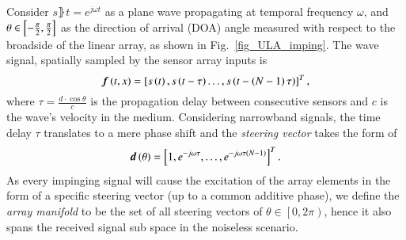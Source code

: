 Consider $s\rBrace{t} = e^{j\omega{t}}$ as a plane wave propagating at temporal frequency $\omega$, and $\theta \in \left[{-\frac{\pi}{2},\frac{\pi}{2}}\right]$ as the direction of arrival (DOA) angle measured with respect to the broadside of the linear array, as shown in Fig.~\ref{fig_ULA_imping}.
The wave signal, spatially sampled by the sensor array inputs is
\begin{equation}
\label{eq_prlm_timeSpace_outputVec}
\boldsymbol{f}\left({t,x}\right) = \left[{s\left({t}\right),s\left({t-\tau}\right)\dots, s\left({t-\left({N-1}\right)\tau}\right)}\right]^{T},
\end{equation}
where $\tau = \frac{d\cdot{}\cos{\theta}}{c}$ is the propagation delay between consecutive sensors and $c$ is the wave's velocity in the medium.
Considering narrowband signals, the time delay $\tau$ translates to a mere phase shift and the \emph{steering vector} takes the form of
\begin{equation}
\boldsymbol{d}\left({\theta}\right)=\left[{1,e^{-j\omega\tau},\dots,e^{-j\omega\tau\left({N-1}\right)}}\right]^{T}.
\end{equation}
As every impinging signal will cause the excitation of the array elements in the form of a specific steering vector (up to a common additive phase), we define the \emph{array manifold} to be the set of all steering vectors of $\theta\in\left[0,2\pi\right)$, hence it also spans the received signal sub space in the noiseless scenario.
